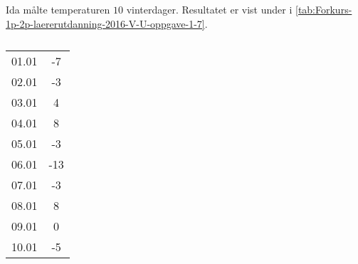 %



\Oppgave[3] 

Ida målte temperaturen $10$ vinterdager. Resultatet er vist under i
\cref{tab:Forkurs-1p-2p-laererutdanning-2016-V-U-oppgave-1-7}.

\begin{table}[H]
    \centering
    \caption{}
    \label{tab:Forkurs-1p-2p-laererutdanning-2016-V-U-oppgave-1-1}
    \begin{tabular}{|c |S[table-format=1.0]|}
         01.01 &  -7 \\
         02.01 &  -3 \\
         03.01 &   4 \\
         04.01 &   8 \\
         05.01 &  -3 \\
         06.01 & -13 \\
         07.01 &  -3 \\
         08.01 &   8 \\
         09.01 &   0 \\
         10.01 &  -5 \\ \hline
    \end{tabular}
\end{table}

